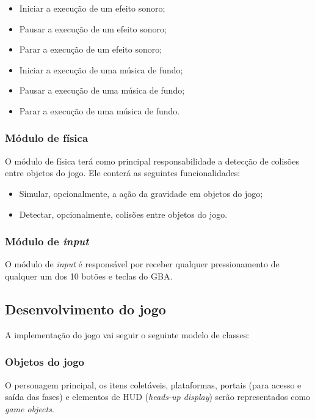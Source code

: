       \begin{itemize}
        \item Iniciar a execução de um efeito sonoro;
        \item Pausar a execução de um efeito sonoro;
        \item Parar a execução de um efeito sonoro;
        \item Iniciar a execução de uma música de fundo;
        \item Pausar a execução de uma música de fundo;
        \item Parar a execução de uma música de fundo.
      \end{itemize}

    \subsubsection{Módulo de física}

      O módulo de física terá como principal responsabilidade a detecção de colisões entre objetos do jogo. Ele conterá as seguintes funcionalidades:

      \begin{itemize}
        \item Simular, opcionalmente, a ação da gravidade em objetos do jogo;
        \item Detectar, opcionalmente, colisões entre objetos do jogo.
      \end{itemize}

    \subsubsection{Módulo de \textit{input}}

      O módulo de \textit{input} é responsável por receber qualquer pressionamento de qualquer um dos 10 botões e teclas do GBA.

  \subsection{Desenvolvimento do jogo}

    A implementação do jogo vai seguir o seguinte modelo de classes:

    \subsubsection{Objetos do jogo}

      O personagem principal, os itens coletáveis, plataformas, portais (para acesso e saída das fases) e elementos de HUD (\textit{heads-up display}) serão representados como \textit{game objects}.

